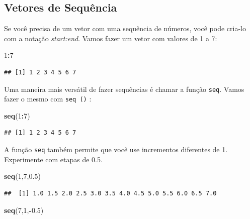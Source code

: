 \documentclass[]{book}
\newenvironment{Shaded}{\begin{snugshade}}{\end{snugshade}}
\newcommand{\DecValTok}[1]{\textcolor[rgb]{0.00,0.00,0.81}{#1}}
\newcommand{\FloatTok}[1]{\textcolor[rgb]{0.00,0.00,0.81}{#1}}
\newcommand{\KeywordTok}[1]{\textcolor[rgb]{0.13,0.29,0.53}{\textbf{#1}}}
\newcommand{\NormalTok}[1]{#1}
\newcommand{\OperatorTok}[1]{\textcolor[rgb]{0.81,0.36,0.00}{\textbf{#1}}}
\begin{document}
\hypertarget{vetores-de-sequencia}{%
\subsection{Vetores de Sequência}\label{vetores-de-sequencia}}

Se você precisa de um vetor com uma sequência de números, você pode cria-lo com a notação \emph{start:end}. Vamos fazer um vetor com valores de 1 a 7:

\begin{Shaded}
\begin{Highlighting}[]
\DecValTok{1}\OperatorTok{:}\DecValTok{7}
\end{Highlighting}
\end{Shaded}

\begin{verbatim}
## [1] 1 2 3 4 5 6 7
\end{verbatim}

Uma maneira mais versátil de fazer sequências é chamar a função \texttt{seq}. Vamos fazer o mesmo com \texttt{seq\ ()} :

\begin{Shaded}
\begin{Highlighting}[]
\KeywordTok{seq}\NormalTok{(}\DecValTok{1}\OperatorTok{:}\DecValTok{7}\NormalTok{)}
\end{Highlighting}
\end{Shaded}

\begin{verbatim}
## [1] 1 2 3 4 5 6 7
\end{verbatim}

A função \texttt{seq} também permite que você use incrementos diferentes de 1. Experimente com etapas de 0.5.

\begin{Shaded}
\begin{Highlighting}[]
\KeywordTok{seq}\NormalTok{(}\DecValTok{1}\NormalTok{,}\DecValTok{7}\NormalTok{,}\FloatTok{0.5}\NormalTok{)}
\end{Highlighting}
\end{Shaded}

\begin{verbatim}
##  [1] 1.0 1.5 2.0 2.5 3.0 3.5 4.0 4.5 5.0 5.5 6.0 6.5 7.0
\end{verbatim}

\begin{Shaded}
\begin{Highlighting}[]
\KeywordTok{seq}\NormalTok{(}\DecValTok{7}\NormalTok{,}\DecValTok{1}\NormalTok{,}\OperatorTok{-}\FloatTok{0.5}\NormalTok{) }
\end{Highlighting}
\end{Shaded}
\end{document}
